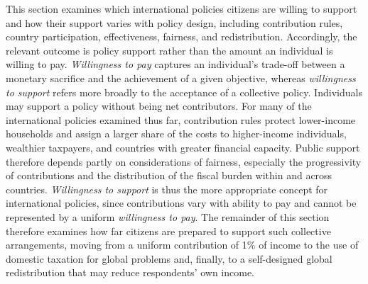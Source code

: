 

This section examines which international policies citizens are willing to support and how their support varies with policy design, including contribution rules, country participation, effectiveness, fairness, and redistribution. Accordingly, the relevant outcome is policy support rather than the amount an individual is willing to pay. \textit{Willingness to pay} captures an individual's trade-off between a monetary sacrifice and the achievement of a given objective, whereas \textit{willingness to support} refers more broadly to the acceptance of a collective policy. Individuals may support a policy without being net contributors. For many of the international policies examined thus far, contribution rules protect lower-income households and assign a larger share of the costs to higher-income individuals, wealthier taxpayers, and countries with greater financial capacity. Public support therefore depends partly on considerations of fairness, especially the progressivity of contributions and the distribution of the fiscal burden within and across countries. \textit{Willingness to support} is thus the more appropriate concept for international policies, since contributions vary with ability to pay and cannot be represented by a uniform \textit{willingness to pay}. The remainder of this section therefore examines how far citizens are prepared to support such collective arrangements, moving from a uniform contribution of 1\% of income to the use of domestic taxation for global problems and, finally, to a self-designed global redistribution that may reduce respondents' own income.



